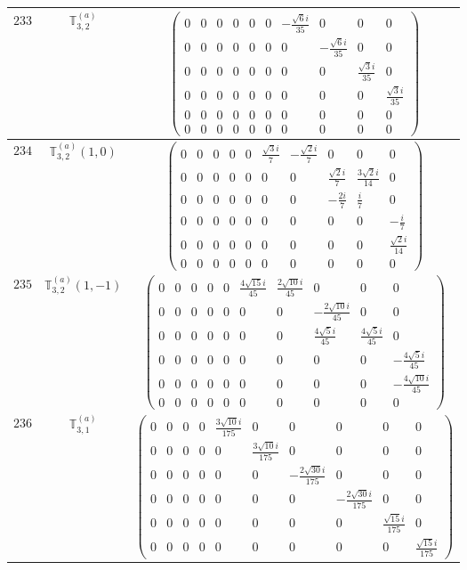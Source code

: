\documentclass[fleqn,8pt,landscape]{jsarticle}
\begin{document}
\begin{center}
\begin{longtable}{ccc}
$ 233 $ & $ \mathbb{T}_{3,2}^{(a)} $ & $ \begin{pmatrix} 0 & 0 & 0 & 0 & 0 & 0 & - \frac{\sqrt{6} i}{35} & 0 & 0 & 0 \\ 0 & 0 & 0 & 0 & 0 & 0 & 0 & - \frac{\sqrt{6} i}{35} & 0 & 0 \\ 0 & 0 & 0 & 0 & 0 & 0 & 0 & 0 & \frac{\sqrt{3} i}{35} & 0 \\ 0 & 0 & 0 & 0 & 0 & 0 & 0 & 0 & 0 & \frac{\sqrt{3} i}{35} \\ 0 & 0 & 0 & 0 & 0 & 0 & 0 & 0 & 0 & 0 \\ 0 & 0 & 0 & 0 & 0 & 0 & 0 & 0 & 0 & 0 \end{pmatrix} $ \\ \hline
$ 234 $ & $ \mathbb{T}_{3,2}^{(a)}(1,0) $ & $ \begin{pmatrix} 0 & 0 & 0 & 0 & 0 & \frac{\sqrt{3} i}{7} & - \frac{\sqrt{2} i}{7} & 0 & 0 & 0 \\ 0 & 0 & 0 & 0 & 0 & 0 & 0 & \frac{\sqrt{2} i}{7} & \frac{3 \sqrt{2} i}{14} & 0 \\ 0 & 0 & 0 & 0 & 0 & 0 & 0 & - \frac{2 i}{7} & \frac{i}{7} & 0 \\ 0 & 0 & 0 & 0 & 0 & 0 & 0 & 0 & 0 & - \frac{i}{7} \\ 0 & 0 & 0 & 0 & 0 & 0 & 0 & 0 & 0 & \frac{\sqrt{2} i}{14} \\ 0 & 0 & 0 & 0 & 0 & 0 & 0 & 0 & 0 & 0 \end{pmatrix} $ \\ \hline
$ 235 $ & $ \mathbb{T}_{3,2}^{(a)}(1,-1) $ & $ \begin{pmatrix} 0 & 0 & 0 & 0 & 0 & \frac{4 \sqrt{15} i}{45} & \frac{2 \sqrt{10} i}{45} & 0 & 0 & 0 \\ 0 & 0 & 0 & 0 & 0 & 0 & 0 & - \frac{2 \sqrt{10} i}{45} & 0 & 0 \\ 0 & 0 & 0 & 0 & 0 & 0 & 0 & \frac{4 \sqrt{5} i}{45} & \frac{4 \sqrt{5} i}{45} & 0 \\ 0 & 0 & 0 & 0 & 0 & 0 & 0 & 0 & 0 & - \frac{4 \sqrt{5} i}{45} \\ 0 & 0 & 0 & 0 & 0 & 0 & 0 & 0 & 0 & - \frac{4 \sqrt{10} i}{45} \\ 0 & 0 & 0 & 0 & 0 & 0 & 0 & 0 & 0 & 0 \end{pmatrix} $ \\ \hline
$ 236 $ & $ \mathbb{T}_{3,1}^{(a)} $ & $ \begin{pmatrix} 0 & 0 & 0 & 0 & \frac{3 \sqrt{10} i}{175} & 0 & 0 & 0 & 0 & 0 \\ 0 & 0 & 0 & 0 & 0 & \frac{3 \sqrt{10} i}{175} & 0 & 0 & 0 & 0 \\ 0 & 0 & 0 & 0 & 0 & 0 & - \frac{2 \sqrt{30} i}{175} & 0 & 0 & 0 \\ 0 & 0 & 0 & 0 & 0 & 0 & 0 & - \frac{2 \sqrt{30} i}{175} & 0 & 0 \\ 0 & 0 & 0 & 0 & 0 & 0 & 0 & 0 & \frac{\sqrt{15} i}{175} & 0 \\ 0 & 0 & 0 & 0 & 0 & 0 & 0 & 0 & 0 & \frac{\sqrt{15} i}{175} \end{pmatrix} $ \\ \hline

\end{longtable}
\end{center}
\end{document}
